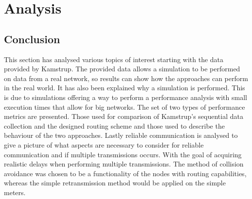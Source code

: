 \chapter{Analysis}
\label{chap:analysis}






\section{Conclusion}
This section has analysed various topics of interest starting with the data provided by Kamstrup. The provided data allows a simulation to be performed on data from a real network, so results can show how the approaches can perform in the real world. It has also been explained why a simulation is performed. This is due to simulations offering a way to perform a performance analysis with small execution times that allow for big networks. The set of two types of performance metrics are presented. Those used for comparison of Kamstrup's sequential data collection and the designed routing scheme and those used to describe the behaviour of the two approaches. Lastly reliable communication is analysed to give a picture of what aspects are necessary to consider for reliable communication and if multiple transmissions occurs. With the goal of acquiring realistic delays when performing multiple transmissions. The method of collision avoidance was chosen to be a functionality of the nodes with routing capabilities, whereas the simple retransmission method would be applied on the simple meters.